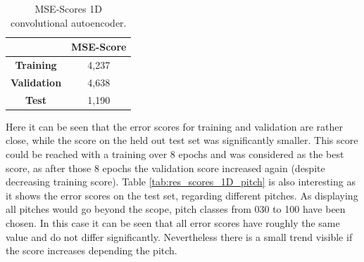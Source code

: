 \begin{table}[htb!]
    \centering
    \begin{tabular}{|c|c|}
        \hline
         & \textbf{MSE-Score} \\
         \hline
        \textbf{Training} & 4,237 \\
        \hline
        \textbf{Validation} & 4,638 \\
        \hline
        \textbf{Test} & 1,190 \\
        \hline
    \end{tabular}
    \caption{MSE-Scores 1D convolutional autoencoder.}%
    \label{tab:res_scores_1Dcae}
\end{table}

Here it can be seen that the error scores for training and validation are rather close, while the score on the held out test set was significantly smaller. This score could be reached with a training over 8 epochs and was considered as the best score, as after those 8 epochs the validation score increased again (despite decreasing training score). Table \ref{tab:res_scores_1D_pitch} is also interesting as it shows the error scores on the test set, regarding different pitches. As displaying all pitches would go beyond the scope, pitch classes from 030 to 100 have been chosen. In this case it can be seen that all error scores have roughly the same value and do not differ significantly. Nevertheless there is a small trend visible if the score increases depending the pitch.

